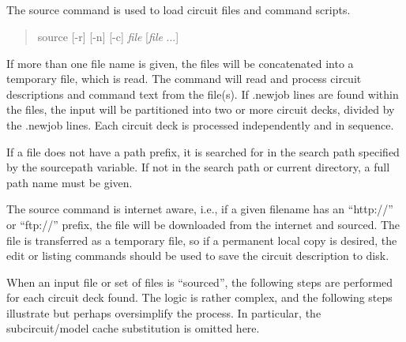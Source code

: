 \subsection{}


The {\cb source} command is used to load circuit files and command
scripts.
\begin{quote}\vt
source [{\vt -r}] [{\vt -n}] [{\vt -c}] {\it file} [{\it file} ...]
\end{quote}
If more than one file name is given, the files will be concatenated
into a temporary file, which is read.  The command will read and
process circuit descriptions and command text from the file(s).  If
{\vt .newjob} lines are found within the files, the input will be
partitioned into two or more circuit decks, divided by the {\vt
.newjob} lines.  Each circuit deck is processed independently and in
sequence.

If a file does not have a path prefix, it is searched for in the
search path specified by the {\et sourcepath} variable.  If not in the
search path or current directory, a full path name must be given.

The {\cb source} command is internet aware, i.e., if a given filename
has an ``{\vt http://}'' or ``{\vt ftp://}'' prefix, the file will be
downloaded from the internet and sourced.  The file is transferred as
a temporary file, so if a permanent local copy is desired, the {\cb
edit} or {\cb listing} commands should be used to save the circuit
description to disk. 

When an input file or set of files is ``sourced'', the following steps
are performed for each circuit deck found.  The logic is rather
complex, and the following steps illustrate but perhaps oversimplify
the process.  In particular, the subcircuit/model cache substitution
is omitted here.

